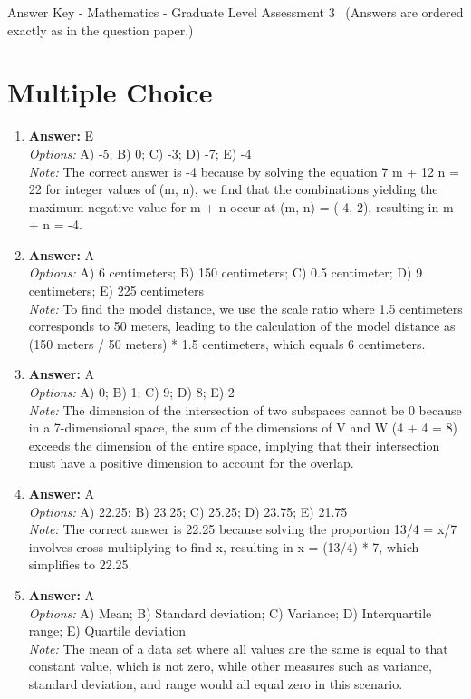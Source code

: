 \documentclass[12pt]{article}
\begin{document}
\begin{center}
Answer Key - Mathematics - Graduate Level Assessment 3 \
\small (Answers are ordered exactly as in the question paper.)
\end{center}

\section*{Multiple Choice}
\begin{enumerate}[label=\arabic*.]
\item \textbf{Answer:} E
\\ \textit{Options:} A) -5; B) 0; C) -3; D) -7; E) -4
\\ \textit{Note:} The correct answer is -4 because by solving the equation 7 m + 12 n = 22 for integer values of (m, n), we find that the combinations yielding the maximum negative value for m + n occur at (m, n) = (-4, 2), resulting in m + n = -4.
\item \textbf{Answer:} A
\\ \textit{Options:} A) 6 centimeters; B) 150 centimeters; C) 0.5 centimeter; D) 9 centimeters; E) 225 centimeters
\\ \textit{Note:} To find the model distance, we use the scale ratio where 1.5 centimeters corresponds to 50 meters, leading to the calculation of the model distance as (150 meters / 50 meters) * 1.5 centimeters, which equals 6 centimeters.
\item \textbf{Answer:} A
\\ \textit{Options:} A) 0; B) 1; C) 9; D) 8; E) 2
\\ \textit{Note:} The dimension of the intersection of two subspaces cannot be 0 because in a 7-dimensional space, the sum of the dimensions of V and W (4 + 4 = 8) exceeds the dimension of the entire space, implying that their intersection must have a positive dimension to account for the overlap.
\item \textbf{Answer:} A
\\ \textit{Options:} A) 22.25; B) 23.25; C) 25.25; D) 23.75; E) 21.75
\\ \textit{Note:} The correct answer is 22.25 because solving the proportion 13/4 = x/7 involves cross-multiplying to find x, resulting in x = (13/4) * 7, which simplifies to 22.25.
\item \textbf{Answer:} A
\\ \textit{Options:} A) Mean; B) Standard deviation; C) Variance; D) Interquartile range; E) Quartile deviation
\\ \textit{Note:} The mean of a data set where all values are the same is equal to that constant value, which is not zero, while other measures such as variance, standard deviation, and range would all equal zero in this scenario.
\end{enumerate}
\end{document}
